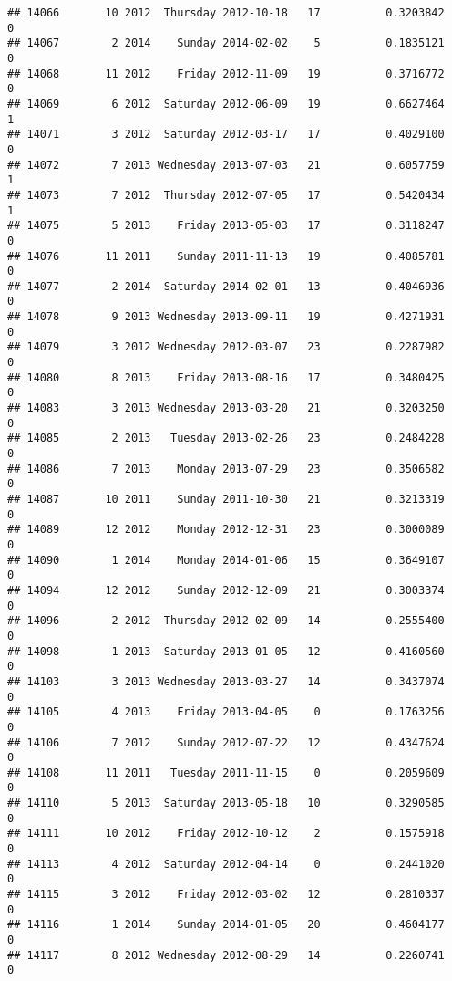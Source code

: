 \documentclass[
]{article}
\begin{document}
\begin{verbatim}
## 14066       10 2012  Thursday 2012-10-18   17          0.3203842             0
## 14067        2 2014    Sunday 2014-02-02    5          0.1835121             0
## 14068       11 2012    Friday 2012-11-09   19          0.3716772             0
## 14069        6 2012  Saturday 2012-06-09   19          0.6627464             1
## 14071        3 2012  Saturday 2012-03-17   17          0.4029100             0
## 14072        7 2013 Wednesday 2013-07-03   21          0.6057759             1
## 14073        7 2012  Thursday 2012-07-05   17          0.5420434             1
## 14075        5 2013    Friday 2013-05-03   17          0.3118247             0
## 14076       11 2011    Sunday 2011-11-13   19          0.4085781             0
## 14077        2 2014  Saturday 2014-02-01   13          0.4046936             0
## 14078        9 2013 Wednesday 2013-09-11   19          0.4271931             0
## 14079        3 2012 Wednesday 2012-03-07   23          0.2287982             0
## 14080        8 2013    Friday 2013-08-16   17          0.3480425             0
## 14083        3 2013 Wednesday 2013-03-20   21          0.3203250             0
## 14085        2 2013   Tuesday 2013-02-26   23          0.2484228             0
## 14086        7 2013    Monday 2013-07-29   23          0.3506582             0
## 14087       10 2011    Sunday 2011-10-30   21          0.3213319             0
## 14089       12 2012    Monday 2012-12-31   23          0.3000089             0
## 14090        1 2014    Monday 2014-01-06   15          0.3649107             0
## 14094       12 2012    Sunday 2012-12-09   21          0.3003374             0
## 14096        2 2012  Thursday 2012-02-09   14          0.2555400             0
## 14098        1 2013  Saturday 2013-01-05   12          0.4160560             0
## 14103        3 2013 Wednesday 2013-03-27   14          0.3437074             0
## 14105        4 2013    Friday 2013-04-05    0          0.1763256             0
## 14106        7 2012    Sunday 2012-07-22   12          0.4347624             0
## 14108       11 2011   Tuesday 2011-11-15    0          0.2059609             0
## 14110        5 2013  Saturday 2013-05-18   10          0.3290585             0
## 14111       10 2012    Friday 2012-10-12    2          0.1575918             0
## 14113        4 2012  Saturday 2012-04-14    0          0.2441020             0
## 14115        3 2012    Friday 2012-03-02   12          0.2810337             0
## 14116        1 2014    Sunday 2014-01-05   20          0.4604177             0
## 14117        8 2012 Wednesday 2012-08-29   14          0.2260741             0

\end{verbatim}
\end{document}
